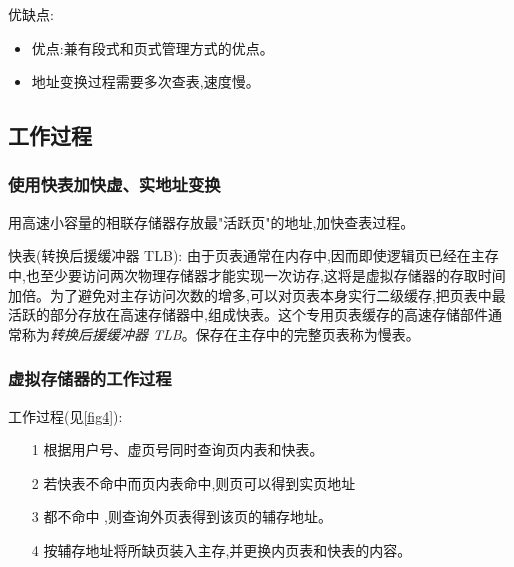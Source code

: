 \documentclass[UTF8,a4paper]{ctexart}%
\begin{document}
\begin{itemize}
                优缺点:
                \begin{itemize}
                  \item 优点:兼有段式和页式管理方式的优点。
                  \item 地址变换过程需要多次查表,速度慢。
                \end{itemize}
          \end{itemize}
      \subsection{工作过程}
          \subsubsection*{使用快表加快虚、实地址变换}

              用高速小容量的相联存储器存放最"活跃页"的地址,加快查表过程。

              快表(转换后援缓冲器 TLB):
              由于页表通常在内存中,因而即使逻辑页已经在主存中,也至少要访问两次物理存储器才能实现一次访存,这将是虚拟存储器的存取时间加倍。为了避免对主存访问次数的增多,可以对页表本身实行二级缓存,把页表中最活跃的部分存放在高速存储器中,组成快表。这个专用页表缓存的高速存储部件通常称为\emph{转换后援缓冲器 TLB}。保存在主存中的完整页表称为慢表。

          \subsubsection*{虚拟存储器的工作过程}
              工作过程(见\ref{fig4}):
              \begin{itemize}
                \item [1] 根据用户号、虚页号同时查询页内表和快表。
                \item [2] 若快表不命中而页内表命中,则页可以得到实页地址
                \item [3] 都不命中 ,则查询外页表得到该页的辅存地址。
                \item [4] 按辅存地址将所缺页装入主存,并更换内页表和快表的内容。
              \end{itemize}
\end{document}
